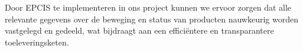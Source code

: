 Door EPCIS te implementeren in ons project kunnen we ervoor zorgen dat alle relevante gegevens over de beweging en status van producten nauwkeurig worden vastgelegd en gedeeld, wat bijdraagt aan een efficiëntere en transparantere toeleveringsketen.






